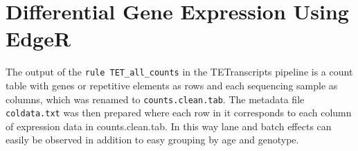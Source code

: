 \documentclass[onehalf,12pt]{beavtex}
\begin{document}
\begin{Shaded}
\begin{Highlighting}[]
          \NormalTok{:}
  \OperatorTok{=}
  \OperatorTok{=}
  \OperatorTok{=}
  \StringTok{ }\StringTok{ \textbackslash{}}
  \StringTok{                }\StringTok{ }\StringTok{ }\StringTok{ \textbackslash{}}
  \StringTok{                }\StringTok{ }\StringTok{ \textbackslash{}}
  \StringTok{ \textbackslash{}}
  \StringTok{ \textbackslash{}}
  \StringTok{ \textbackslash{}}
  \end{Highlighting}
  \end{Shaded}
  
  \section{Differential Gene Expression Using
  EdgeR}\label{differential-gene-expression-using-edger}
  
  The output of the \texttt{rule\ TET\_all\_counts} in the TETranscripts
  pipeline is a count table with genes or repetitive elements as rows and
  each sequencing sample as columns, which was renamed to
  \texttt{counts.clean.tab}. The metadata file \texttt{coldata.txt} was
  then prepared where each row in it corresponds to each column of
  expression data in counts.clean.tab. In this way lane and batch effects
  can easily be observed in addition to easy grouping by age and genotype.
  
\end{document}
